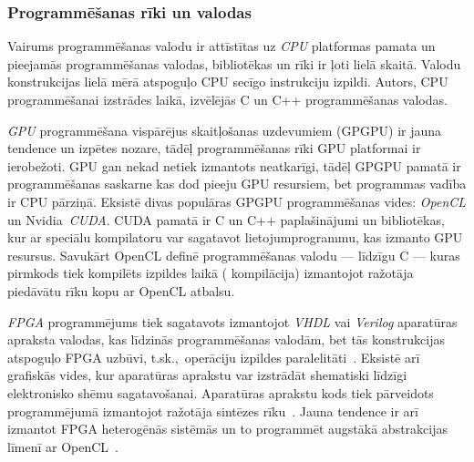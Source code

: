 \subsubsection*{Programmēšanas rīki un valodas}
Vairums programmēšanas valodu ir attīstītas uz \emph{CPU} platformas pamata un
pieejamās programmēšanas valodas, bibliotēkas un rīki ir ļoti lielā
skaitā. Valodu konstrukcijas lielā mērā atspoguļo CPU secīgo instrukciju
izpildi. Autors, CPU programmēšanai izstrādes laikā, izvēlējās C un C++
programmēšanas valodas.

\emph{GPU} programmēšana vispārējus skaitļošanas uzdevumiem (GPGPU) ir jauna
tendence un izpētes nozare,
tādēļ programmēšanas rīki GPU platformai ir ierobežoti. GPU gan nekad netiek
izmantots neatkarīgi, tādēļ GPGPU pamatā ir programmēšanas saskarne
kas dod pieeju GPU resursiem, bet programmas vadība ir CPU pārziņā.
Eksistē divas populāras GPGPU programmēšanas vides: \emph{OpenCL} un
Nvidia~\emph{CUDA}. CUDA pamatā ir C un C++ paplašinājumi un bibliotēkas,
kur ar speciālu kompilatoru var sagatavot lietojumprogrammu, kas izmanto
GPU resursus. Savukārt OpenCL definē programmēšanas valodu --- līdzīgu C ---
kuras pirmkods tiek kompilēts izpildes laikā ( kompilācija)
izmantojot ražotāja piedāvātu rīku kopu ar OpenCL atbalsu.
\cite{Fatahalian}\cite{Owens-GPU}\cite{OpenCL-book}\cite{CUDA}

\emph{FPGA} programmējums tiek sagatavots izmantojot \emph{VHDL} vai
\emph{Verilog} aparatūras apraksta valodas, kas līdzinās programmēšanas
valodām, bet tās konstrukcijas atspoguļo FPGA uzbūvi, t.sk.,~operāciju
izpildes paralelitāti~\cite{JIS}.
Eksistē arī grafiskās vides, kur aparatūras aprakstu
var izstrādāt shematiski līdzīgi elektronisko shēmu sagatavošanai.
Aparatūras aprakstu kods tiek pārveidots programmējumā izmantojot
ražotāja sintēzes rīku~\cite{JIS}. Jauna tendence ir arī izmantot FPGA
heterogēnās sistēmās un to programmēt augstākā abstrakcijas līmenī ar
OpenCL~\cite{FPGA-ocl}.
